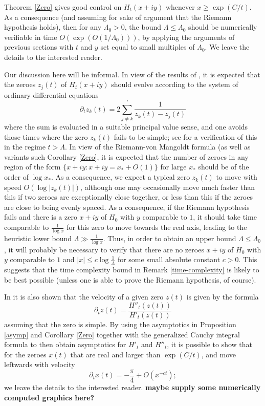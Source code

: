 \begin{remark}\label{time-complexity}  Theorem \ref{Zero} gives good control on $H_t(x+iy)$ whenever $x \geq \exp( C/t )$.  As a consequence (and assuming for sake of argument that the Riemann hypothesis holds), then for any $\Lambda_0 > 0$, the bound $\Lambda \leq \Lambda_0$ should be numerically verifiable in time $O( \exp( O(1/\Lambda_0) ))$, by applying the arguments of previous sections with $t$ and $y$ set equal to small multiples of $\Lambda_0$.  We leave the details to the interested reader.
\end{remark}

\begin{remark} Our discussion here will be informal.  In view of the results of \cite{csv}, it is expected that the zeroes $z_j(t)$ of $H_t(x+iy)$ should evolve according to the system of ordinary differential equations
$$ \partial_t z_k(t) = 2 \sum_{j \neq k}^{\prime} \frac{1}{z_k(t) - z_j(t)}$$
where the sum is evaluated in a suitable principal value sense, and one avoids those times where the zero $z_k(t)$ fails to be simple; see \cite[Lemma 2.4]{csv} for a verification of this in the regime $t > \Lambda$.  In view of the Riemann-von Mangoldt formula (as well as variants such Corollary \ref{Zero}, it is expected that the number of zeroes in any region of the form $\{ x+iy: x+iy = x_* + O(1) \}$ for large $x_*$ should be of the order of $\log x_*$.  As a consequence, we expect a typical zero $z_k(t)$ to move with speed $O( \log |z_k(t)| )$, although one may occasionally move much faster than this if two zeroes are exceptionally close together, or less than this if the zeroes are close to being evenly spaced.  As a consequence, if the Riemann hypothesis fails and there is a zero $x+iy$ of $H_0$ with $y$ comparable to $1$, it should take time comparable to $\frac{1}{\log x}$ for this zero to move towards the real axis, leading to the heuristic lower bound $\Lambda \gg \frac{1}{\log x}$.  Thus, in order to obtain an upper bound $\Lambda \leq \Lambda_0$, it will probably be necessary to verify that there are no zeroes $x+iy$ of $H_0$ with $y$ comparable to $1$ and $|x| \leq c \log \frac{1}{\Lambda}$ for some small absolute constant $c>0$.  This suggests that the time complexity bound in Remark \ref{time-complexity} is likely to be best possible (unless one is able to prove the Riemann hypothesis, of course).

In \cite[Lemma 2.1]{csv} it is also shown that the velocity of a given zero $z(t)$ is given by the formula
$$ \partial_t z(t) = \frac{H''_t(z(t))}{H'_t(z(t))}$$
assuming that the zero is simple.  By using the asymptotics in Proposition \ref{asymp} and Corollary \ref{Zero} together with the generalized Cauchy integral formula to then obtain asymptotics for $H'_t$ and $H''_t$, it is possible to show that for the zeroes $x(t)$ that are real and larger than $\exp(C/t)$, and move leftwards with velocity
$$ \partial_t x(t) = - \frac{\pi}{4} + O( x^{-ct} );$$
we leave the details to the interested reader.  {\bf maybe supply some numerically computed graphics here?}
\end{remark}
